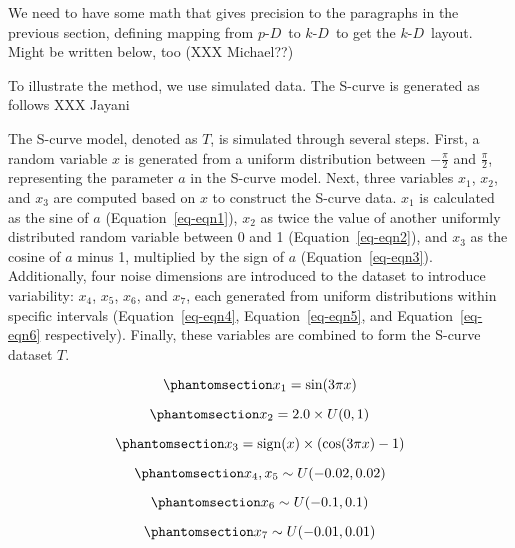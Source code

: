 \documentclass[
  12pt]{article}
\newcommand\pD{$p\text{-}D$\ }
\newcommand\kD{$k\text{-}D$\ }
\begin{document}
We need to have some math that gives precision to the paragraphs in the
previous section, defining mapping from \pD to \kD to get the
\kD layout. Might be written below, too (XXX Michael??)

To illustrate the method, we use simulated data. The S-curve is
generated as follows XXX Jayani

The S-curve model, denoted as \(T\), is simulated through several steps.
First, a random variable \(x\) is generated from a uniform distribution
between \(-\frac{\pi}{2}\) and \(\frac{\pi}{2}\), representing the
parameter \(a\) in the S-curve model. Next, three variables \(x_1\),
\(x_2\), and \(x_3\) are computed based on \(x\) to construct the
S-curve data. \(x_1\) is calculated as the sine of \(a\)
(Equation~\ref{eq-eqn1}), \(x_2\) as twice the value of another
uniformly distributed random variable between 0 and 1
(Equation~\ref{eq-eqn2}), and \(x_3\) as the cosine of \(a\) minus 1,
multiplied by the sign of \(a\) (Equation~\ref{eq-eqn3}). Additionally,
four noise dimensions are introduced to the dataset to introduce
variability: \(x_4\), \(x_5\), \(x_6\), and \(x_7\), each generated from
uniform distributions within specific intervals (Equation~\ref{eq-eqn4},
Equation~\ref{eq-eqn5}, and Equation~\ref{eq-eqn6} respectively).
Finally, these variables are combined to form the S-curve dataset \(T\).

\begin{equation}\phantomsection\label{eq-eqn1}{
x_1 = \sin(3 \pi x)
}\end{equation}

\begin{equation}\phantomsection\label{eq-eqn2}{
x_2 = 2.0 \times U(0, 1)
}\end{equation}

\begin{equation}\phantomsection\label{eq-eqn3}{
x_3 = \text{sign}(x) \times (\cos(3 \pi x) - 1)
}\end{equation}

\begin{equation}\phantomsection\label{eq-eqn4}{
x_4, x_5 \sim U(-0.02, 0.02)
}\end{equation}

\begin{equation}\phantomsection\label{eq-eqn5}{
x_6 \sim U(-0.1, 0.1)
}\end{equation}

\begin{equation}\phantomsection\label{eq-eqn6}{
x_7 \sim U(-0.01, 0.01)
}\end{equation}
\end{document}
